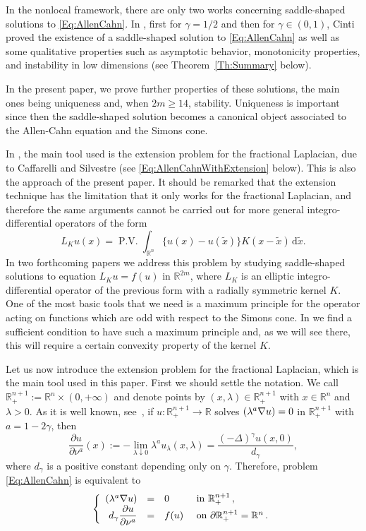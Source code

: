 \documentclass[12pt,reqno]{amsart}
\theoremstyle{definition}
\theoremstyle{remark}
\newcommand{\con}[1]{\mathbb{#1}}
\newcommand{\R}{\con{R}} %
\newcommand{\s}{\gamma}
\newcommand{\fraclaplacian}{(-\Delta)^\s}
\renewcommand{\d}{\,\mathrm{d}} %
\newcommand\beqc[1]{\left\{\begin{array}{#1}}
\newcommand\eeqc{\end{array} \right.}
\def\PDEsystem{rcll}
\DeclareMathOperator{\PV}{P.V.}
\let\div\relax
\DeclareMathOperator{\div}{div}
\numberwithin{equation}{section}
\begin{document}
In the nonlocal framework, there are only two works concerning saddle-shaped solutions to \eqref{Eq:AllenCahn}. In  \cite{Cinti-Saddle,Cinti-Saddle2}, first for $\s=1/2$ and then for $\s\in(0,1)$, Cinti proved the existence of a saddle-shaped solution to \eqref{Eq:AllenCahn} as well as some qualitative properties such as asymptotic behavior, monotonicity properties, and instability in low dimensions (see Theorem~\ref{Th:Summary} below). 

In the present paper, we prove further properties of these solutions, the main ones being uniqueness and, when $2m\geq 14$, stability. Uniqueness is important since then the saddle-shaped solution becomes a canonical object associated to the Allen-Cahn equation and the Simons cone. 

In \cite{Cinti-Saddle,Cinti-Saddle2}, the main tool used is the extension problem for the fractional Laplacian, due to Caffarelli and Silvestre \cite{CaffarelliSilvestre} (see \eqref{Eq:AllenCahnWithExtension} below). This is also the approach of the present paper. It should be remarked that the extension technique has the limitation that it only works for the fractional Laplacian, and therefore the same arguments cannot be carried out for more general integro-differential operators of the form
$$
L_K u(x) = \PV \int_{\R^n} \{u(x) - u(\tilde{x})\} K(x-\tilde{x})\d \tilde{x}.
$$
In two forthcoming papers \cite{FelipeSanz-Perela:IntegroDifferentialI,FelipeSanz-Perela:IntegroDifferentialII} we address this problem by studying saddle-shaped solutions to equation $L_K u = f(u)$ in $\R^{2m}$, where $L_K$ is an elliptic integro-differential operator of the previous form with a radially symmetric kernel $K$. One of the most basic tools that we need is a maximum principle for the operator acting on  functions which are odd with respect to the Simons cone. In \cite{FelipeSanz-Perela:IntegroDifferentialI} we find a sufficient condition to have such a maximum principle and, as we will see there, this will require a certain convexity property of the kernel $K$.

Let us now introduce the extension problem for the fractional Laplacian, which is the main tool used in this paper. First we should settle the notation. We call $\R^{n+1}_+ := \R^n \times (0, +\infty)$ and denote points by $(x,\lambda)\in \R^{n+1}_+$ with $x\in \R^n$ and $\lambda > 0$. As it is well known, see~\cite{CaffarelliSilvestre}, if $u:\R^{n+1}_+ \to \R$ solves $\div(\lambda^a \nabla u) = 0$ in $\R^{n+1}_+$ with $a=1-2\s$, then
$$
\dfrac{\partial u}{\partial \nu^a} (x) := -\lim_{\lambda \downarrow 0} \lambda^a u_\lambda (x, \lambda) = \dfrac{\fraclaplacian u (x,0)}{d_\s},
$$
where $d_\s$ is a positive constant depending only on $\s$. Therefore, problem \eqref{Eq:AllenCahn} is equivalent to
\begin{equation}
\label{Eq:AllenCahnWithExtension}
\beqc{\PDEsystem}
\div(\lambda^a \nabla u) &=& 0 & \textrm{ in } \R^{n+1}_+\,, \\
d_\s \dfrac{\partial u}{\partial \nu^a} &=& f(u) & \textrm{ on } \partial \R^{n+1}_+ = \R^n\,.
\eeqc
\end{equation}
\end{document}
